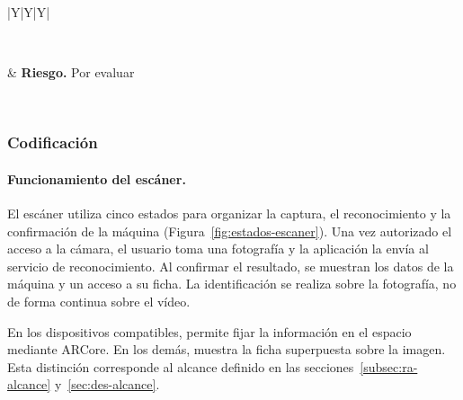 \begin{table}[H]
\begin{tabularx}{\textwidth}{|Y|Y|Y|}
 \\
\hline

 \\
\hline

& \textbf{Riesgo.} Por evaluar \\
\hline

 \\
\hline

\end{tabularx}
\caption{Story Card 06: Pantalla del escáner de máquinas}
\label{tab:hu-it3}
\end{table}

\subsubsection{Codificación}

\paragraph{Funcionamiento del escáner.} El escáner utiliza cinco estados
para organizar la captura, el reconocimiento y la confirmación de la máquina
(Figura~\ref{fig:estados-escaner}). Una vez autorizado el acceso a la cámara,
el usuario toma una fotografía y la aplicación la envía al servicio de
reconocimiento. Al confirmar el resultado, se muestran los datos de la máquina
y un acceso a su ficha. La identificación se realiza sobre la fotografía,
no de forma continua sobre el vídeo.

En los dispositivos compatibles,  permite fijar la
información en el espacio mediante ARCore. En los demás, 
muestra la ficha superpuesta sobre la imagen. Esta
distinción corresponde al alcance definido en las
secciones~\ref{subsec:ra-alcance} y~\ref{sec:des-alcance}.

